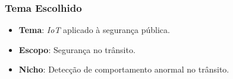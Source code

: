 \begin{frame}
	\frametitle{Tema Escolhido}
	\begin{itemize}[<+->]
		\item[] \textbf{Tema}:
		\textit{IoT} aplicado à segurança pública.
		\item[] \textbf{Escopo}:
		Segurança no trânsito.
		\item[] \textbf{Nicho}:
		Detecção de comportamento anormal no trânsito.
	\end{itemize}
\end{frame}